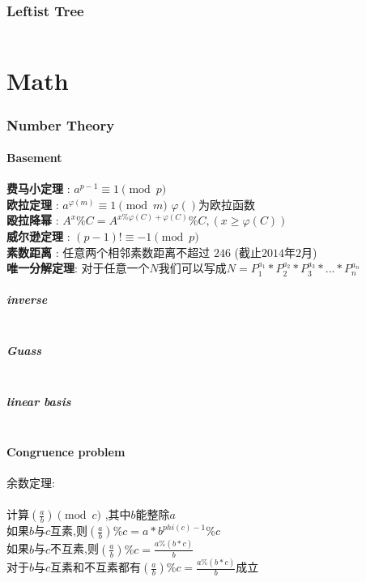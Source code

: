 \documentclass[a4paper,10pt]{article}
\begin{document}
    	\section{Leftist Tree}
              \inputminted[breaklines]{c++}{Date_structure/Leftist-Tree.cc}
	\newpage
	\part{Math} %
		\section{Number Theory}
			\subsection{Basement}
			
	            \textbf{费马小定理}  :  $a^{p-1} \equiv 1 \pmod p$\\
				\textbf{欧拉定理}    :  $a^{\varphi(m)} \equiv 1 \pmod m$ $\varphi()$为欧拉函数\\
				\textbf{殴拉降幂}    :  $A^x\%C=A^{x\%\varphi(C)+\varphi(C)}\%C,(x\ge \varphi(C))$\\
				\textbf{威尔逊定理}  :  $(p-1)!\equiv -1 \pmod p$\\
				\textbf{素数距离}    :  任意两个相邻素数距离不超过 $246$ (截止$2014$年$2$月)\\
				\textbf{唯一分解定理}:  对于任意一个$N$我们可以写成$N=P_1^{a_1}*P_2^{a_2}*P_3^{a_3}*...*P_n^{a_n}$
				
				\subsubsection{inverse}
					\inputminted[breaklines]{c++}{Math/inverse.cc}
                \subsubsection{Guass}
                    \inputminted[breaklines]{c++}{Math/Guass.cc}
                \subsubsection{linear basis}
                    \inputminted[breaklines]{c++}{Math/linear-basis.cc}
                    
			\subsection{Congruence problem}
                余数定理:\\
                \\
                计算$\left(\frac{a}{b}\right)\pmod{c}$ ,其中$b$能整除$a$\\
                如果$b$与$c$互素,则$(\frac{a}{b})\%c=a*b^{phi(c)-1}\%c$\\
                如果$b$与$c$不互素,则$(\frac{a}{b})\%c=\frac{a\%(b*c)}{b}$\\
                对于$b$与$c$互素和不互素都有$(\frac{a}{b})\%c=\frac{a\%(b*c)}{b}$成立\\
\end{document}
